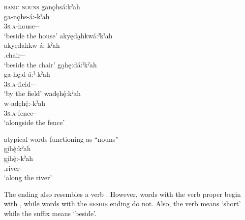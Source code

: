 \newpage
\ea\label{ex:kaloc} \textsc{basic nouns}
\ea ganǫhsá:kˀah\\
\gll ga-nǫhs-á:-kˀah\\
 \textsc{3s.a}-house-{\joinerA}-\\
\glt `beside the house'
\ex akyęda̱hkwá:ˀkˀah\\
\gll akyęda̱hkw-á:-kˀah\\
 {\noprefix}.chair-{\joinerA}-\\
\glt `beside the chair'
\ex ga̱hę:dá:ˀkˀah\\
\gll ga̱-hę:d-á:ˀ-kˀah\\
 \textsc{3s.a}-field-{\joinerA}-\\
\glt `by the field'
\ex wadęhę́:kˀah\\
\gll w-adęhę́:-kˀah\\
 \textsc{3s.a}-fence-{\joinerA}-\\
\glt `alongside the fence'
\z
\z

\ea\label{ex:kaloc2} atypical words functioning as “nouns” \\
gi̱hę́:kˀah\\
\gll gi̱hę́:-kˀah\\
 {\noprefix}.river-\\
\glt `along the river'
\z


The  ending also resembles a verb . However, words with the verb proper begin with  \textsc{\partitive}, while words with the  \textsc{beside} ending do not. Also, the verb  means ‘short’ while the  suffix means ‘beside’.

